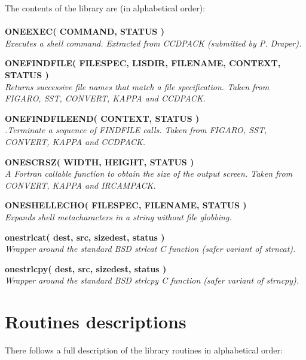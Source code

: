\documentclass[twoside,11pt]{article}
\newcommand{\noteroutine}[2]{\textbf{#1}\hspace*{\fill}\nopagebreak \\
                             \hspace*{3em}\emph{#2}\hspace*{\fill}\par}
\renewcommand{\_}{\texttt{\symbol{95}}}
\begin{document}
The contents of the library are (in alphabetical order):\\
\\
\noteroutine{ONE\_EXEC( COMMAND, STATUS )}
    {Executes a shell command.
    Extracted from CCDPACK (submitted by P. Draper).}
\noteroutine{ONE\_FIND\_FILE( FILESPEC, LISDIR, FILENAME, CONTEXT, STATUS )}
    {Returns successive file names that match a file specification.
    Taken from FIGARO, SST, CONVERT, KAPPA and CCDPACK.}
\noteroutine{ONE\_FIND\_FILE\_END( CONTEXT, STATUS )}
    {.Terminate a sequence of FIND\_FILE calls.
    Taken from FIGARO, SST, CONVERT, KAPPA and CCDPACK.}
\noteroutine{ONE\_SCRSZ( WIDTH, HEIGHT, STATUS )}
    {A Fortran callable function to obtain the size of the output screen.
    Taken from CONVERT, KAPPA and IRCAMPACK.}
\noteroutine{ONE\_SHELL\_ECHO( FILESPEC, FILENAME, STATUS )}
    {Expands shell metacharacters in a string without file globbing.}
\noteroutine{one\_strlcat( dest, src, sizedest, status )}
    {Wrapper around the standard BSD strlcat C function (safer variant
      of strncat).}
\noteroutine{one\_strlcpy( dest, src, sizedest, status )}
    {Wrapper around the standard BSD strlcpy C function (safer variant of strncpy).}
\section{Routines descriptions}
There follows a full description of the library routines in alphabetical order:
\end{document}
